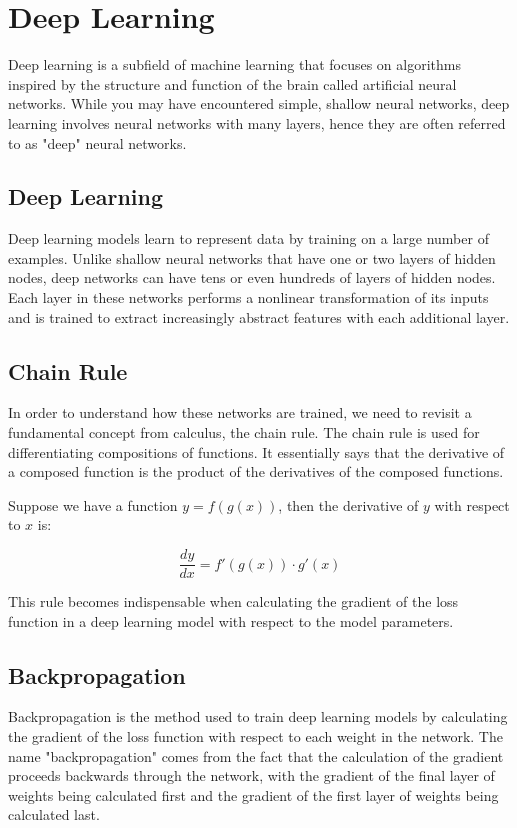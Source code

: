\chapter{Deep Learning}

Deep learning is a subfield of machine learning that focuses on algorithms inspired by the structure and function of the brain called artificial neural networks. While you may have encountered simple, shallow neural networks, deep learning involves neural networks with many layers, hence they are often referred to as "deep" neural networks.

\section{Deep Learning}

Deep learning models learn to represent data by training on a large number of examples. Unlike shallow neural networks that have one or two layers of hidden nodes, deep networks can have tens or even hundreds of layers of hidden nodes. Each layer in these networks performs a nonlinear transformation of its inputs and is trained to extract increasingly abstract features with each additional layer.

\section{Chain Rule}

In order to understand how these networks are trained, we need to revisit a fundamental concept from calculus, the chain rule. The chain rule is used for differentiating compositions of functions. It essentially says that the derivative of a composed function is the product of the derivatives of the composed functions.

Suppose we have a function $y = f(g(x))$, then the derivative of $y$ with respect to $x$ is:

\begin{equation}
\frac{dy}{dx} = f'(g(x)) \cdot g'(x)
\end{equation}

This rule becomes indispensable when calculating the gradient of the loss function in a deep learning model with respect to the model parameters.

\section{Backpropagation}

Backpropagation is the method used to train deep learning models by calculating the gradient of the loss function with respect to each weight in the network. The name "backpropagation" comes from the fact that the calculation of the gradient proceeds backwards through the network, with the gradient of the final layer of weights being calculated first and the gradient of the first layer of weights being calculated last.

